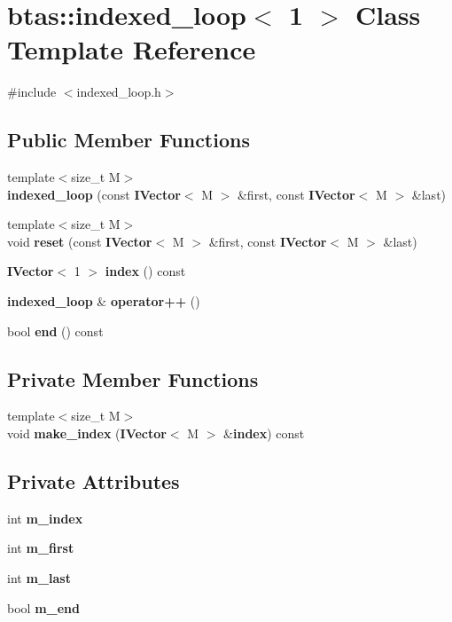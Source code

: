 \section{btas\-:\-:indexed\-\_\-loop$<$ 1 $>$ Class Template Reference}
\label{d7/d39/classbtas_1_1indexed__loop_3_011_01_4}


{\ttfamily \#include $<$indexed\-\_\-loop.\-h$>$}

\subsection*{Public Member Functions}
\begin{DoxyCompactItemize}
\item 
{\footnotesize template$<$size\-\_\-t M$>$ }\\{\bf indexed\-\_\-loop} (const {\bf I\-Vector}$<$ M $>$ \&first, const {\bf I\-Vector}$<$ M $>$ \&last)
\item 
{\footnotesize template$<$size\-\_\-t M$>$ }\\void {\bf reset} (const {\bf I\-Vector}$<$ M $>$ \&first, const {\bf I\-Vector}$<$ M $>$ \&last)
\item 
{\bf I\-Vector}$<$ 1 $>$ {\bf index} () const 
\item 
{\bf indexed\-\_\-loop} \& {\bf operator++} ()
\item 
bool {\bf end} () const 
\end{DoxyCompactItemize}
\subsection*{Private Member Functions}
\begin{DoxyCompactItemize}
\item 
{\footnotesize template$<$size\-\_\-t M$>$ }\\void {\bf make\-\_\-index} ({\bf I\-Vector}$<$ M $>$ \&{\bf index}) const 
\end{DoxyCompactItemize}
\subsection*{Private Attributes}
\begin{DoxyCompactItemize}
\item 
int {\bf m\-\_\-index}
\item 
int {\bf m\-\_\-first}
\item 
int {\bf m\-\_\-last}
\item 
bool {\bf m\-\_\-end}
\end{DoxyCompactItemize}
